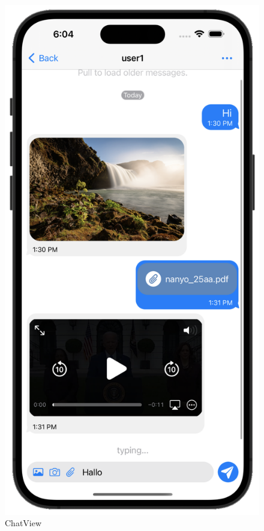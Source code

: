     \begin{figure}[h]
        \includegraphics[scale=0.5]{chat_white}
        \centering
        \caption{ChatView}\label{fig:chatview}
    \end{figure}

